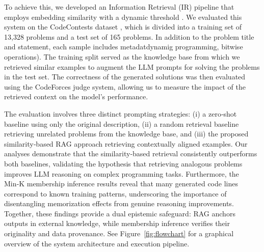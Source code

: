 \documentclass[preprint,12pt]{elsarticle}
\begin{document}

To achieve this, we developed an Information Retrieval (IR) pipeline that employs embedding similarity with a dynamic threshold \cite{ReEffIRDinamicoIntroduzido}. We evaluated this system on the CodeContests dataset \cite{li2022competition}, which is divided into a training set of 13,328 problems and a test set of 165 problems. In addition to the problem title and statement, each sample includes metadatdynamig programming, bitwise operations). The training split served as the knowledge base from which we retrieved similar examples to augment the LLM prompts for solving the problems in the test set. The correctness of the generated solutions was then evaluated using the CodeForces \cite{codeforces} judge system, allowing us to measure the impact of the retrieved context on the model's performance.

The evaluation involves three distinct prompting strategies: (i) a zero‑shot baseline using only the original description, (ii) a random retrieval baseline retrieving unrelated problems from the knowledge base, and (iii) the proposed similarity‑based RAG approach retrieving contextually aligned examples. Our analyses demonstrate that the similarity‑based retrieval consistently outperforms both baselines, validating the hypothesis that retrieving analogous problems improves LLM reasoning on complex programming tasks. Furthermore, the Min‑K membership inference results reveal that many generated code lines correspond to known training patterns, underscoring the importance of disentangling memorization effects from genuine reasoning improvements. Together, these findings provide a dual epistemic safeguard: RAG anchors outputs in external knowledge, while membership inference verifies their originality and data provenance. See Figure~\ref{fig:flowchart} for a graphical overview of the system architecture and execution pipeline.

\end{document}
